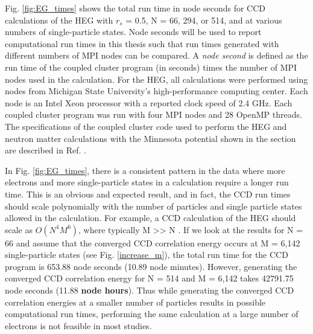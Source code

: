 Fig. \ref{fig:EG_times} shows the total run time in node seconds for CCD calculations of the HEG with $r_s$ = 0.5, N = 66, 294, or 514, and at various numbers of single-particle states. Node seconds will be used to report computational run times in this thesis such that run times generated with different numbers of MPI nodes can be compared. A \textit{node second} is defined as the run time of the coupled cluster program (in seconds) times the number of MPI nodes used in the calculation. For the HEG, all calculations were performed using nodes from Michigan State University's high-performance computing center. Each node is an Intel Xeon processor with a reported clock speed of 2.4 GHz. Each coupled cluster program was run with four MPI nodes and 28 OpenMP threads. The specifications of the coupled cluster code used to perform the HEG and neutron matter calculations with the Minnesota potential shown in the section are described in Ref. \cite{Ref5}.

In Fig. \ref{fig:EG_times}, there is a consistent pattern in the data where more electrons and more single-particle states in a calculation require a longer run time. This is an obvious and expected result, and in fact, the CCD run times should scale polynomially with the number of particles and single particle states allowed in the calculation. For example, a CCD calculation of the HEG should scale as $O(N^4M^6)$, where typically M >> N \cite{Ref2}. If we look at the results for N = 66 and assume that the converged CCD correlation energy occurs at M = 6,142 single-particle states (see Fig. \ref{increase_m}), the total run time for the CCD program is 653.88 node seconds (10.89 node minutes). However, generating the converged CCD correlation energy for N = 514 and M = 6,142 takes 42791.75 node seconds (11.88 \textbf{node hours}). Thus while generating the converged CCD correlation energies at a smaller number of particles results in possible computational run times, performing the same calculation at a large number of electrons is not feasible in most studies.

